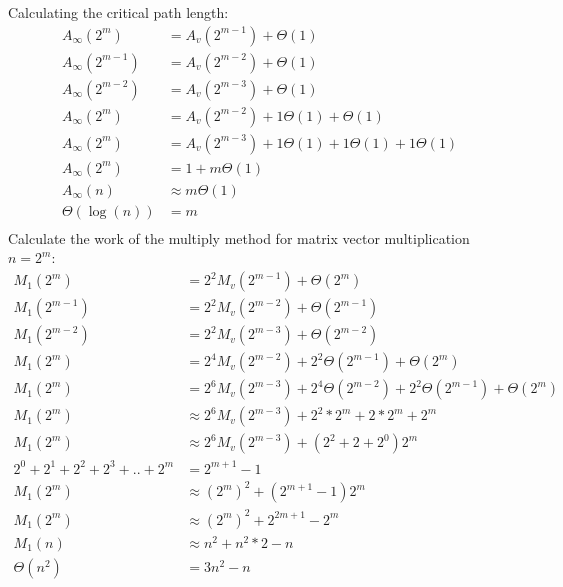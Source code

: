 \documentclass[11pt,letterpaper]{exam}
\begin{document}
\begin{questions}
\begin{parts}
\begin{subparts}
							Calculating the critical path length:
							\begin{align*}
								A_\infty(2^m) &= A_v(2^{m-1}) + \Theta(1)\\
								A_\infty(2^{m-1}) &= A_v(2^{m-2}) + \Theta(1)\\
								A_\infty(2^{m-2}) &= A_v(2^{m-3}) + \Theta(1)\\
								A_\infty(2^m) &= A_v(2^{m-2}) + 1\Theta(1) + \Theta(1)\\
								A_\infty(2^m) &= A_v(2^{m-3}) + 1\Theta(1) + 1\Theta(1) + 1\Theta(1)\\
								A_\infty(2^m) &= 1 + m\Theta(1)\\
								A_\infty(n) &\approx m\Theta(1)\\
								\Theta(\log(n)) &= m\\								
							\end{align*}
						\newpage	
						\subpart
							Calculate the work of the multiply method for matrix vector multiplication $n = 2^m$:
							\begin{align*}
								M_1(2^m) &= 2^2M_v(2^{m-1}) + \Theta(2^m)\\
								M_1(2^{m-1}) &= 2^2M_v(2^{m-2}) + \Theta(2^{m-1})\\
								M_1(2^{m-2}) &= 2^2M_v(2^{m-3}) + \Theta(2^{m-2})\\
								M_1(2^m) &= 2^4M_v(2^{m-2}) + 2^2\Theta(2^{m-1}) + \Theta(2^m)\\
								M_1(2^m) &= 2^6M_v(2^{m-3}) + 2^4\Theta(2^{m-2}) + 2^2\Theta(2^{m-1}) + \Theta(2^m)\\
								M_1(2^m) &\approx 2^6M_v(2^{m-3}) + 2^2*2^m + 2*2^m + 2^m\\
								M_1(2^m) &\approx 2^6M_v(2^{m-3}) + (2^2 + 2 + 2^0)2^m\\
								2^0+2^1+2^2+2^3+..+2^m &= 2^{m+1}-1\\
								M_1(2^m) &\approx (2^m)^2 + (2^{m+1}-1)2^m\\
								M_1(2^m) &\approx (2^m)^2 + 2^{2m+1}-2^m\\
								M_1(n) &\approx n^2 + n^2*2-n\\
								\Theta(n^2) &= 3n^2-n\\								
							\end{align*}
							

\end{subparts}
\end{parts}
\end{questions}
\end{document}
